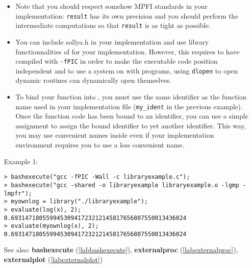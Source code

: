 \begin{itemize}
\item Note that you should respect somehow MPFI standards in your implementation:
   \verb|result| has its own precision and you should perform the 
   intermediate computations so that \verb|result| is as tight as possible.

\item You can include sollya.h in your implementation and use library 
   functionnalities of \sollya for your implementation. However, this requires to have compiled
   \sollya with \texttt{-fPIC} in order to make the \sollya executable code position 
   independent and to use a system on with programs, using \texttt{dlopen} to open
   dynamic routines can dynamically open themselves.

\item To bind your function into \sollya, you must use the same identifier as the
   function name used in your implementation file (\verb|my_ident| in the previous
   example). Once the function code has been bound to an identifier, you can use a simple assignment
   to assign the bound identifier to yet another identifier. This way, you may use convenient
   names inside \sollya even if your implementation environment requires you to use a less
   convenient name.
\end{itemize}
\noindent Example 1: 
\begin{center}\begin{minipage}{15cm}\begin{Verbatim}[frame=single]
> bashexecute("gcc -fPIC -Wall -c libraryexample.c");
> bashexecute("gcc -shared -o libraryexample libraryexample.o -lgmp -lmpfr");
> myownlog = library("./libraryexample");
> evaluate(log(x), 2);
0.69314718055994530941723212145817656807550013436024
> evaluate(myownlog(x), 2);
0.69314718055994530941723212145817656807550013436024
\end{Verbatim}
\end{minipage}\end{center}
See also: \textbf{bashexecute} (\ref{labbashexecute}), \textbf{externalproc} (\ref{labexternalproc}), \textbf{externalplot} (\ref{labexternalplot})
